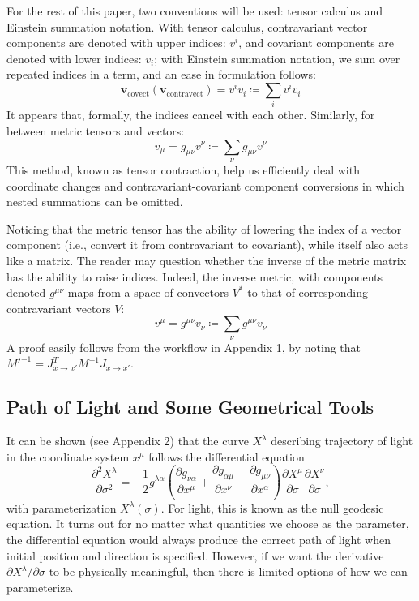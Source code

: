 \documentclass[conference]{IEEEtran}
\begin{document}
For the rest of this paper, two conventions will be used: tensor calculus 
and Einstein summation notation. With tensor calculus, contravariant vector 
components are denoted with upper indices: $v^i$, and covariant components are 
denoted with lower indices: $v_i$; with Einstein summation notation, we sum over 
repeated indices in a term, and an ease in formulation follows:
\[
\mathbf{v}_{\text{covect}}\left(\mathbf{v}_{\text{contravect}}\right)=
v^i v_i \coloneqq \sum_{i}{v^iv_i}
\]
It appears that, formally, the indices cancel with each other. Similarly, 
for between metric tensors and vectors:
\[
v_\mu=g_{\mu\nu}v^\nu \coloneq \sum_{\nu} g_{\mu\nu}v^\nu
\]
This method, known as tensor contraction, help us efficiently deal with 
coordinate changes and contravariant-covariant component conversions in which 
nested summations can be omitted. 

Noticing that the metric tensor has the ability of lowering the index of a 
vector component (i.e., convert it from contravariant to covariant), while 
itself also acts like a matrix. The reader may question whether the inverse 
of the metric matrix has the ability to raise indices. Indeed, the inverse metric, 
with components denoted $g^{\mu\nu}$ maps from a space of convectors $V^*$ to that of 
corresponding contravariant vectors $V$:
\[
v^\mu=g^{\mu\nu}v_\nu \coloneq \sum_{\nu} g^{\mu\nu}v_\nu
\]
A proof easily follows from the workflow in Appendix 1, by noting that 
$M'^{-1} = J_{x \rightarrow x'}^T M^{-1} J_{x \rightarrow x'}$.

\subsection{Path of Light and Some Geometrical Tools}
It can be shown (see Appendix 2) that the curve $X^\lambda$ describing trajectory of 
light in the coordinate system $x^\mu$
follows the differential equation
\[
\frac{\partial^2 X^\lambda}{\partial \sigma^2}
 = -\frac{1}{2} g^{\lambda\alpha} \left( \frac{\partial g_{\nu\alpha}}{\partial x^\mu}
+\frac{\partial g_{\alpha\mu}}{\partial x^\nu}
-\frac{\partial g_{\mu\nu}}{\partial x^\alpha}\right)
\frac{\partial X^\mu}{\partial \sigma}
\frac{\partial X^\nu}{\partial \sigma},
\tag{4}
\]
with parameterization $X^\lambda(\sigma)$. For light, this is known as the null 
geodesic equation. It turns out for no matter what quantities
we choose as the parameter, the differential equation would always produce the 
correct path of light when initial position and direction is specified. However, if 
we want the derivative $\partial X^\lambda /\partial \sigma$ to be physically 
meaningful, then there is limited options of how we can parameterize.
\end{document}
